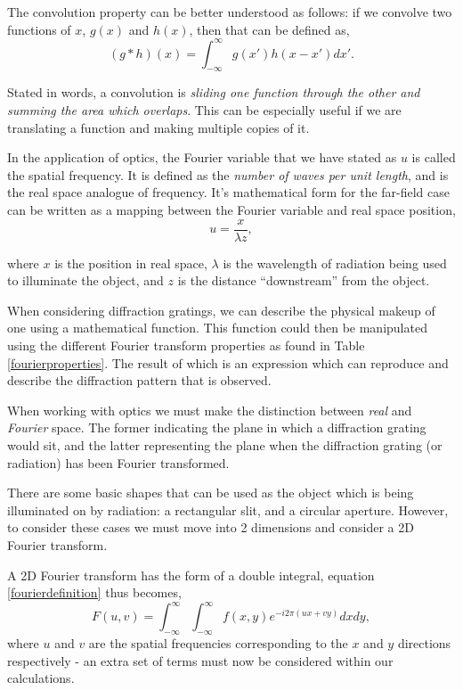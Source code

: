 \documentclass[twocolumn]{revtex4}
\begin{document}
The convolution property can be better understood as follows: if we convolve two functions of $x$, $g(x)$ and $h(x)$, then that can be defined as,
\begin{equation}
(g*h)(x) = \int_{-\infty}^\infty g(x')h(x-x') dx'.
\end{equation}

Stated in words, a convolution is \textit{sliding one function through the other and summing the area which overlaps}. This can be especially useful if we are translating a function and making multiple copies of it.

In the application of optics, the Fourier variable that we have stated as $u$ is called the spatial frequency. It is defined as the \textsl{number of waves per unit length}, and is the real space analogue of frequency. It's mathematical form for the far-field case can be written as a mapping between the Fourier variable and real space position,
\begin{equation}
u=\frac{x}{\lambda z},
\end{equation}

where $x$ is the position in real space, $\lambda$ is the wavelength of radiation being used to illuminate the object, and $z$ is the distance ``downstream'' from the object.

When considering diffraction gratings, we can describe the physical makeup of one using a mathematical function. This function could then be manipulated using the different Fourier transform properties as found in Table \ref{fourierproperties}. The result of which is an expression which can reproduce and describe the diffraction pattern that is observed. 

When working with optics we must make the distinction between \textit{real} and \textit{Fourier} space. The former indicating the plane in which a diffraction grating would sit, and the latter representing the plane when the diffraction grating (or radiation) has been Fourier transformed. 

There are some basic shapes that can be used as the object which is being illuminated on by radiation: a rectangular slit, and a circular aperture. However, to consider these cases we must move into 2 dimensions and consider a 2D Fourier transform. 

A 2D Fourier transform has the form of a double integral, equation \ref{fourierdefinition} thus becomes,
\begin{equation}
F(u,v) = \int_{-\infty}^{\infty} \int_{-\infty}^{\infty}f(x,y)e^{-i2\pi(ux+vy)}dxdy,
\end{equation}
where $u$ and $v$ are the spatial frequencies corresponding to the $x$ and $y$ directions respectively - an extra set of terms must now be considered within our calculations.
\end{document}
